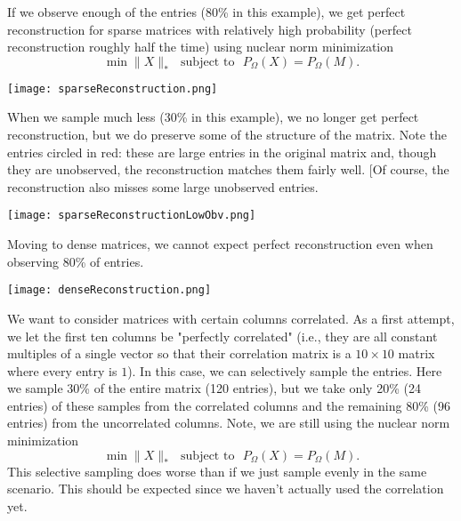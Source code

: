 \documentclass[12pt]{article}
\begin{document}
If we observe enough of the entries (80\% in this example), we get perfect reconstruction for sparse matrices with relatively high probability (perfect reconstruction roughly half the time) using nuclear norm minimization $$\min \| X \|_* \,\,\,\, \text{subject to} \,\,\,\, P_\Omega(X) = P_{\Omega}(M).$$ 

\begin{center}
\texttt{[image: sparseReconstruction.png]}\\
\end{center}

\noindent\makebox[\linewidth]{\rule{\textwidth}{2pt}}

When we sample much less (30\% in this example), we no longer get perfect reconstruction, but we do preserve some of the structure of the matrix. Note the entries circled in red: these are large entries in the original matrix and, though they are unobserved, the reconstruction matches them fairly well. [Of course, the reconstruction also misses some large unobserved entries.
  
\begin{center}
\texttt{[image: sparseReconstructionLowObv.png]}\\
\end{center}  
  
  
\noindent\makebox[\linewidth]{\rule{\textwidth}{2pt}}  

Moving to dense matrices, we cannot expect perfect reconstruction even when observing 80\% of entries.
  
\begin{center}
\texttt{[image: denseReconstruction.png]}\\
\end{center}  
  
\noindent\makebox[\linewidth]{\rule{\textwidth}{2pt}}  

We want to consider matrices with certain columns correlated. As a first attempt, we let the first ten columns be "perfectly correlated" (i.e., they are all constant multiples of a single vector so that their correlation matrix is a $10\times 10$ matrix where every entry is $1$). In this case, we can selectively sample the entries. Here we sample 30\% of the entire matrix (120 entries), but we take only 20\% (24 entries) of these samples from the correlated columns and the remaining 80\% (96 entries) from the uncorrelated columns. Note, we are still using the nuclear norm minimization $$\min \| X \|_* \,\,\,\, \text{subject to} \,\,\,\, P_\Omega(X) = P_{\Omega}(M).$$ This selective sampling does worse than if we just sample evenly in the same scenario. This should be expected since we haven't actually used the correlation yet.
  
\end{document}

